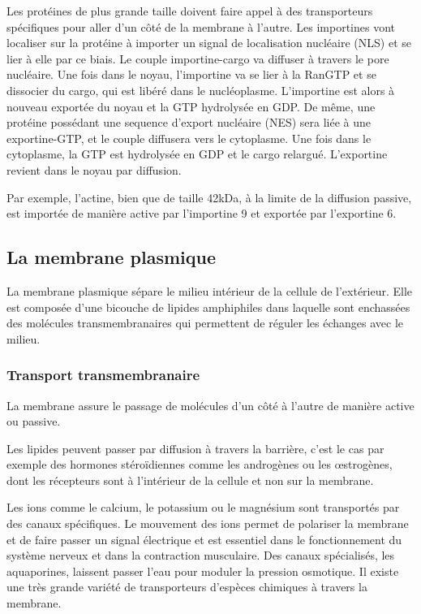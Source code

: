 \documentclass{report}
\begin{document}
Les protéines de plus grande taille doivent faire appel à des transporteurs spécifiques pour aller d'un côté de la membrane à l'autre. 
Les importines vont localiser sur la protéine à importer un signal de localisation nucléaire (NLS) et se lier à elle par ce biais. Le couple importine-cargo va diffuser à travers le pore nucléaire. 
Une fois dans le noyau, l'importine va se lier à la RanGTP et se dissocier du cargo, qui est libéré dans le nucléoplasme. L'importine est alors à nouveau exportée du noyau et la GTP hydrolysée en GDP. 
De même, une protéine possédant une sequence d'export nucléaire (NES) sera liée à une exportine-GTP, et le couple diffusera vers le cytoplasme. Une fois dans le cytoplasme, la GTP est hydrolysée en GDP et le cargo relargué. L'exportine revient dans le noyau par diffusion. 

Par exemple, l'actine, bien que de taille 42kDa, à la limite de la diffusion passive, est importée de manière active par l'importine 9 et exportée par l'exportine 6. 

\subsection{La membrane plasmique}

La membrane plasmique sépare le milieu intérieur de la cellule de l'extérieur. Elle est composée d'une bicouche de lipides amphiphiles dans laquelle sont enchassées des molécules transmembranaires qui permettent de réguler les échanges avec le milieu. 

\subsubsection{Transport transmembranaire}
La membrane assure le passage de molécules d'un côté à l'autre de manière active ou passive. 

Les lipides peuvent passer par diffusion à travers la barrière, c'est le cas par exemple des hormones stéroïdiennes comme les androgènes ou les \oe strogènes, dont les récepteurs sont à l'intérieur de la cellule et non sur la membrane.

Les ions comme le calcium, le potassium ou le magnésium sont transportés par des canaux spécifiques. Le mouvement des ions permet de polariser la membrane et de faire passer un signal électrique et est essentiel dans le fonctionnement du système nerveux et dans la contraction musculaire. Des canaux spécialisés, les aquaporines, laissent passer l'eau pour moduler la pression osmotique. Il existe une très grande variété de transporteurs d'espèces chimiques à travers la membrane. 
\end{document}
